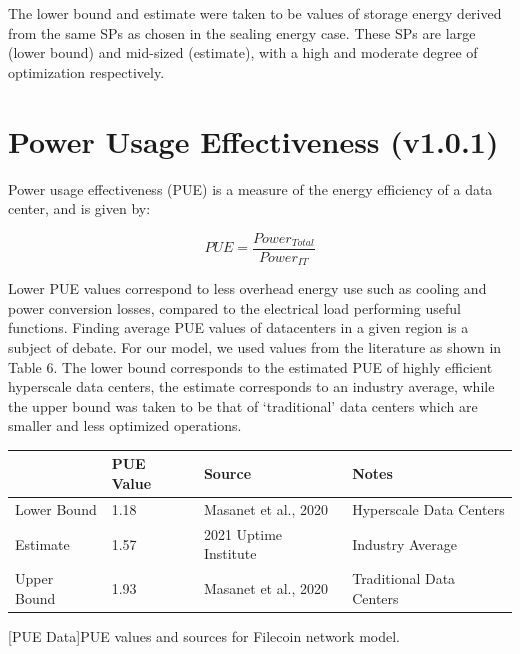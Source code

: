 \documentclass[9pt, oneside]{article}   	%
\begin{document}
\begin{multicols}{2}
The lower bound and estimate were taken to be values of storage energy derived from the same SPs as chosen in the sealing energy case. These SPs are large (lower bound) and mid-sized (estimate), with a high and moderate degree of optimization respectively. 

\section{Power Usage Effectiveness (v1.0.1)}

Power usage effectiveness (PUE) is a measure of the energy efficiency of a data center, and is given by:

\[
PUE = \frac{Power_{Total}}{Power_{IT}}
 \tag{Equation 2}
 \label{pueEq}
\]

Lower PUE values correspond to less overhead energy use such as cooling and power conversion losses, compared to the electrical load performing useful functions. Finding average PUE values of datacenters in a given region is a subject of debate. For our model, we used values from the literature as shown in Table 6. The lower bound corresponds to the estimated PUE of highly efficient hyperscale data centers, the estimate corresponds to an industry average, while the upper bound was taken to be that of ‘traditional’ data centers which are smaller and less optimized operations.



\end{multicols}
\vspace{1 cm}
\begin{center}
 \noindent \begin{tabular}{||  | p{3cm} | p{3cm} | p{4cm} | p{5cm} ||} 
 \hline
  & \textbf{PUE Value} & \textbf{Source} & \textbf{Notes}\\
   \hline
 Lower Bound & 1.18 & Masanet et al., 2020 & Hyperscale Data Centers\\
    \hline
 Estimate & 1.57 & 2021 Uptime Institute & Industry Average\\
    \hline
Upper Bound & 1.93 & Masanet et al., 2020 & Traditional Data Centers\\
   \hline
\end{tabular}
\begin{flushleft}
[PUE Data]{PUE values and sources for Filecoin network model.}
\label{pueTable}
\end{flushleft}
\end{center}
\begin{multicols}{2}


\end{multicols}
\end{document}
